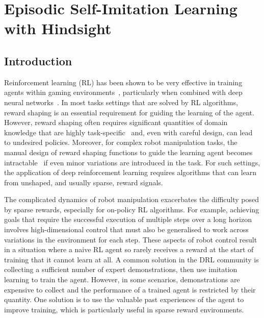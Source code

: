 \chapter{Episodic Self-Imitation Learning with Hindsight}
\label{ch:esil}
\section{Introduction}
Reinforcement learning (RL) has been shown to be very effective in training agents within gaming environments~\cite{mnih2015human,silver2016mastering}, particularly when combined with deep neural networks~\cite{lecun2015deep,silver2016mastering,liu2017survey}. In most tasks settings that are solved by RL algorithms, reward shaping is an essential requirement for guiding the learning of the agent. However, reward shaping often requires significant quantities of domain knowledge that {are} highly task-specific~\cite{ng1999policy} and, even with careful design, can lead to undesired policies. Moreover, for complex robot manipulation tasks, the manual design of reward shaping functions to guide the learning agent becomes intractable~\cite{arulkumaran2017deep,florensa2017reverse} if even minor variations are introduced in the task. For such settings, the application of deep reinforcement learning requires algorithms that can learn from unshaped, and usually sparse, reward signals. 

The complicated dynamics of robot manipulation exacerbates the difficulty posed by sparse rewards, especially for on-policy RL algorithms. For example, achieving goals that require the successful execution of multiple steps over a long horizon involves high-dimensional control that must also be generalised to work across variations in the environment for each step. These aspects of robot control result in a situation where a naive RL agent so rarely receives a reward at the start of training that it cannot learn at all. A common solution in the DRL community is collecting a sufficient number of expert demonstrations, then use imitation learning to train the agent. However, in some scenarios, demonstrations are expensive to collect and the performance of a trained agent is restricted by their quantity. One solution is to use the valuable past experiences of the agent to improve training, which is particularly useful in sparse reward environments.

